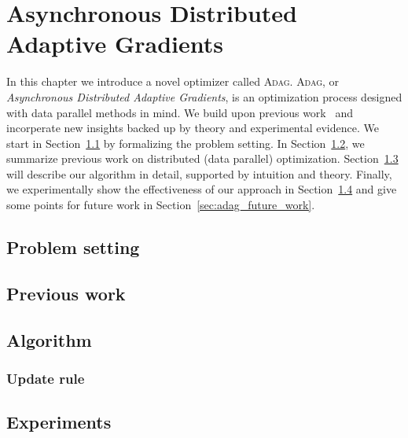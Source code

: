%
%
%

\chapter{Asynchronous Distributed Adaptive Gradients}
\label{chapter:asynchronous_distributed_adaptive_gradients}

In this chapter we introduce a novel optimizer called \textsc{Adag}. \textsc{Adag}, or \emph{Asynchronous Distributed Adaptive Gradients}, is an optimization process designed with data parallel methods in mind. We build upon previous work~\cite{dean2012large,hadjis2016omnivore,kingma2014adam,zhang2015deep} and incorperate new insights backed up by theory and experimental evidence. We start in Section~\ref{sec:adag_problem_setting} by formalizing the problem setting. In Section~\ref{sec:adag_previous_work}, we summarize previous work on distributed (data parallel) optimization. Section~\ref{sec:adag_algorithm} will describe our algorithm in detail, supported by intuition and theory. Finally, we experimentally show the effectiveness of our approach in Section~\ref{sec:adag_experiments} and give some points for future work in Section~\ref{sec:adag_future_work}.

\section{Problem setting}
\label{sec:adag_problem_setting}

\section{Previous work}
\label{sec:adag_previous_work}

\section{Algorithm}
\label{sec:adag_algorithm}

\subsection{Update rule}
\label{sec:adag_update_rule}

\section{Experiments}
\label{sec:adag_experiments}

